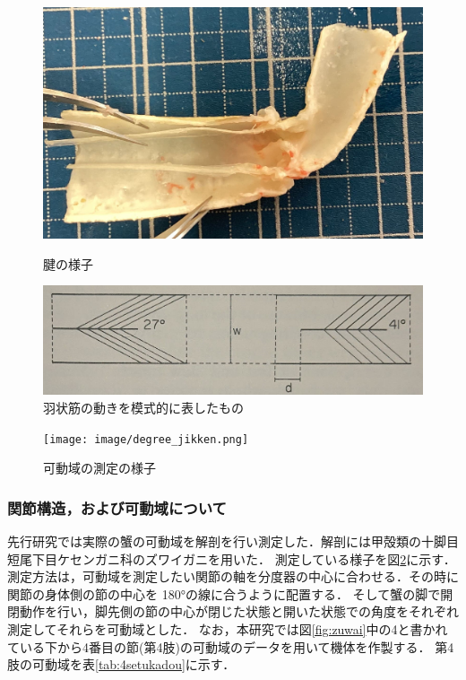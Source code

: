 \begin{figure}[ht]
  \begin{minipage}[b]{0.39\hsize}
    \centering
    \includegraphics[scale=0.08]{image/setukanmaku.jpg}
    \caption{腱の様子\cite{hasegawa}}
    \label{fig:ken}
  \end{minipage}
  \begin{minipage}[b]{0.6\hsize}
    \centering
    \includegraphics[scale=0.18]{image/ujo.JPG}
    \caption{羽状筋の動きを模式的に表したもの\cite{warner1977biology}}
    \label{fig:ujo}
  \end{minipage}
\end{figure}
\begin{figure}[!ht]
  \centering
  \texttt{[image: image/degree\_jikken.png]}
  \caption{可動域の測定の様子}
  \label{fig:sokutei}
\end{figure}
\subsubsection{関節構造，および可動域について}
先行研究\cite{hasegawa}では実際の蟹の可動域を解剖を行い測定した．解剖には甲殻類の十脚目短尾下目ケセンガニ科のズワイガニを用いた．
測定している様子を図\ref{fig:sokutei}に示す．測定方法は，可動域を測定したい関節の軸を分度器の中心に合わせる．その時に関節の身体側の節の中心を 180°の線に合うように配置する．
そして蟹の脚で開閉動作を行い，脚先側の節の中心が閉じた状態と開いた状態での角度をそれぞれ測定してそれらを可動域とした．
なお，本研究では図\ref{fig:zuwai}中の4と書かれている下から4番目の節(第4肢)の可動域のデータを用いて機体を作製する．
第4肢の可動域を表\ref{tab:4setukadou}に示す．
